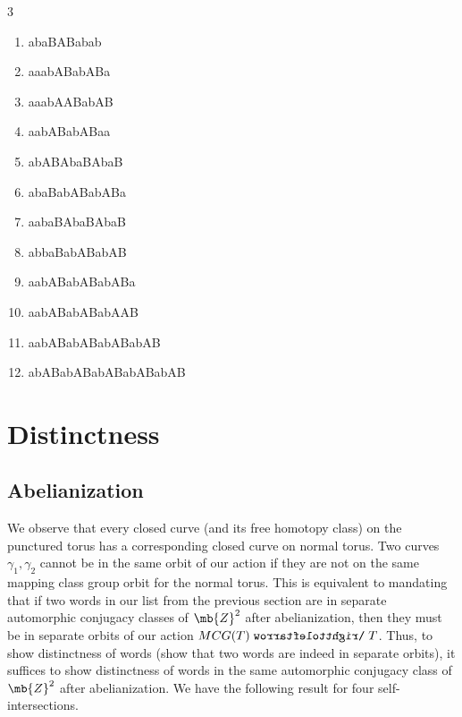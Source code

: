 \documentclass[11pt]{article}
\def\acts{\mathrel{\reflectbox{$\righttoleftarrow$}}}
\begin{document}
\begin{prop}
\begin{multicols}{3}
\begin{enumerate}
\item abaBABabab
\item aaabABabABa
\item aaabAABabAB
\item aabABabABaa
\item abABAbaBAbaB
\item abaBabABabABa
\item aabaBAbaBAbaB
\item abbaBabABabAB
\item aabABabABabABa
\item aabABabABabAAB
\item aabABabABabABabAB
\item abABabABabABabABabAB
\end{enumerate}
\end{multicols}
\end{prop}

\section{Distinctness}

\subsection*{Abelianization}

We observe that every closed curve (and its free homotopy class) on the punctured torus has a corresponding closed curve on normal torus. Two curves $\gamma_1,\gamma_2$ cannot be in the same orbit of our action if they are not on the same mapping class group orbit for the normal torus. This is equivalent to mandating that if two words in our list from the previous section are in separate automorphic conjugacy classes of $\mb{Z}^2$ after abelianization, then they must be in separate orbits of our action $MCG(T)\acts T$. Thus, to show distinctness of words (show that two words are indeed in separate orbits), it suffices to show distinctness of words in the same automorphic conjugacy class of $\mb{Z}^2$ after abelianization. We have the following result for four self-intersections.
\end{document}

